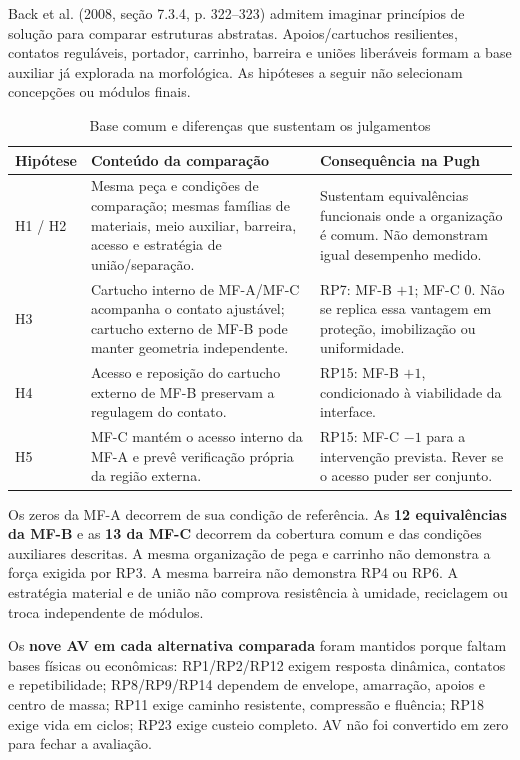 
Back et al. (2008, seção 7.3.4, p. 322--323) admitem imaginar princípios de solução para comparar estruturas abstratas. Apoios/cartuchos resilientes, contatos reguláveis, portador, carrinho, barreira e uniões liberáveis formam a base auxiliar já explorada na morfológica. As hipóteses a seguir não selecionam concepções ou módulos finais.

\begin{table}[H]
\caption{Base comum e diferenças que sustentam os julgamentos}
\centering\small
\begin{tabularx}{\textwidth}{L{1.7cm}YL{7.2cm}}
\toprule\textbf{Hipótese}&\textbf{Conteúdo da comparação}&\textbf{Consequência na Pugh}\\\midrule
H1 / H2&Mesma peça e condições de comparação; mesmas famílias de materiais, meio auxiliar, barreira, acesso e estratégia de união/separação.&Sustentam equivalências funcionais onde a organização é comum. Não demonstram igual desempenho medido.\\
H3&Cartucho interno de MF-A/MF-C acompanha o contato ajustável; cartucho externo de MF-B pode manter geometria independente.&RP7: MF-B $+1$; MF-C $0$. Não se replica essa vantagem em proteção, imobilização ou uniformidade.\\
H4&Acesso e reposição do cartucho externo de MF-B preservam a regulagem do contato.&RP15: MF-B $+1$, condicionado à viabilidade da interface.\\
H5&MF-C mantém o acesso interno da MF-A e prevê verificação própria da região externa.&RP15: MF-C $-1$ para a intervenção prevista. Rever se o acesso puder ser conjunto.\\\bottomrule
\end{tabularx}
\end{table}

Os zeros da MF-A decorrem de sua condição de referência. As \textbf{12 equivalências da MF-B} e as \textbf{13 da MF-C} decorrem da cobertura comum e das condições auxiliares descritas. A mesma organização de pega e carrinho não demonstra a força exigida por RP3. A mesma barreira não demonstra RP4 ou RP6. A estratégia material e de união não comprova resistência à umidade, reciclagem ou troca independente de módulos.

Os \textbf{nove AV em cada alternativa comparada} foram mantidos porque faltam bases físicas ou econômicas: RP1/RP2/RP12 exigem resposta dinâmica, contatos e repetibilidade; RP8/RP9/RP14 dependem de envelope, amarração, apoios e centro de massa; RP11 exige caminho resistente, compressão e fluência; RP18 exige vida em ciclos; RP23 exige custeio completo. AV não foi convertido em zero para fechar a avaliação.

